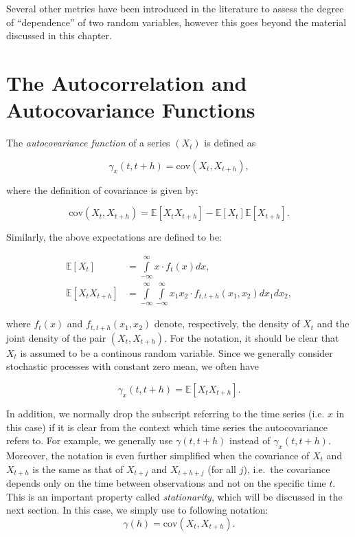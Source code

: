 \documentclass[]{book}
\theoremstyle{definition}
\theoremstyle{definition}
\theoremstyle{definition}
\theoremstyle{remark}
\let\BeginKnitrBlock\begin \let\EndKnitrBlock\end
\begin{document}
Several other metrics have been introduced in the literature to assess
the degree of ``dependence'' of two random variables, however this goes
beyond the material discussed in this chapter.

\hypertarget{the-autocorrelation-and-autocovariance-functions}{%
\section{The Autocorrelation and Autocovariance
Functions}\label{the-autocorrelation-and-autocovariance-functions}}

\BeginKnitrBlock{definition}
\protect\hypertarget{def:acvf}{}{\label{def:acvf} }The \emph{autocovariance
function} of a series \((X_t)\) is defined as

\[{\gamma_x}\left( {t,t+h} \right) = \text{cov} \left( {{X_t},{X_{t+h}}} \right),\]
\EndKnitrBlock{definition}

where the definition of covariance is given by:

\[
    \text{cov} \left( {{X_t},{X_{t+h}}} \right) = \mathbb{E}\left[ {{X_t}{X_{t+h}}} \right] - \mathbb{E}\left[ {{X_t}} \right]\mathbb{E}\left[ {{X_{t+h}}} \right].
    \]

Similarly, the above expectations are defined to be:

\[\begin{aligned}
     \mathbb{E}\left[ {{X_t}} \right] &= \int\limits_{ - \infty }^\infty  {x \cdot {f_t}\left( x \right)dx},  \\
     \mathbb{E}\left[ {{X_t}{X_{t+h}}} \right] &= \int\limits_{ - \infty }^\infty  {\int\limits_{ - \infty }^\infty  {{x_1}{x_2} \cdot f_{t,t+h}\left( {{x_1},{x_2}} \right)d{x_1}d{x_2}} } ,
     \end{aligned} \]

where \({f_t}\left( x \right)\) and
\(f_{t,t+h}\left( {{x_1},{x_2}} \right)\) denote, respectively, the
density of \(X_t\) and the joint density of the pair \((X_t, X_{t+h})\).
For the notation, it should be clear that \(X_t\) is assumed to be a
continous random variable. Since we generally consider stochastic
processes with constant zero mean, we often have

\[{\gamma_x}\left( {t,t+h} \right) = \mathbb{E}\left[X_t X_{t+h} \right]. \]

In addition, we normally drop the subscript referring to the time series
(i.e. \(x\) in this case) if it is clear from the context which time
series the autocovariance refers to. For example, we generally use
\({\gamma}\left( {t,t+h} \right)\) instead of
\({\gamma_x}\left( {t,t+h} \right)\). Moreover, the notation is even
further simplified when the covariance of \(X_t\) and \(X_{t+h}\) is the
same as that of \(X_{t+j}\) and \(X_{t+h+j}\) (for all \(j\)), i.e.~the
covariance depends only on the time between observations and not on the
specific time \(t\). This is an important property called
\emph{stationarity}, which will be discussed in the next section. In
this case, we simply use to following notation:
\[\gamma \left( {h} \right) = \text{cov} \left( X_t , X_{t+h} \right). \]
\end{document}
